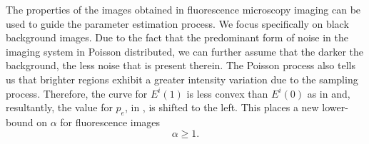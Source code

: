 The properties of the images obtained in fluorescence microscopy imaging can be used to guide the parameter estimation process. We focus specifically on black background images. Due to the fact that the predominant form of noise in the imaging system in Poisson distributed, we can further assume that the darker the background, the less noise that is present therein. The Poisson process also tells us that brighter regions exhibit a greater intensity variation due to the sampling process. Therefore, the curve for $E^i(1)$ is less convex than $E^i(0)$ as in  and, resultantly, the value for $p_e$, in , is shifted to the left. This places a new lower-bound on $\alpha$ for fluorescence images
\begin{equation}
	\alpha \geq 1.
	\label{eq:alphalowerboundFM}
\end{equation}

